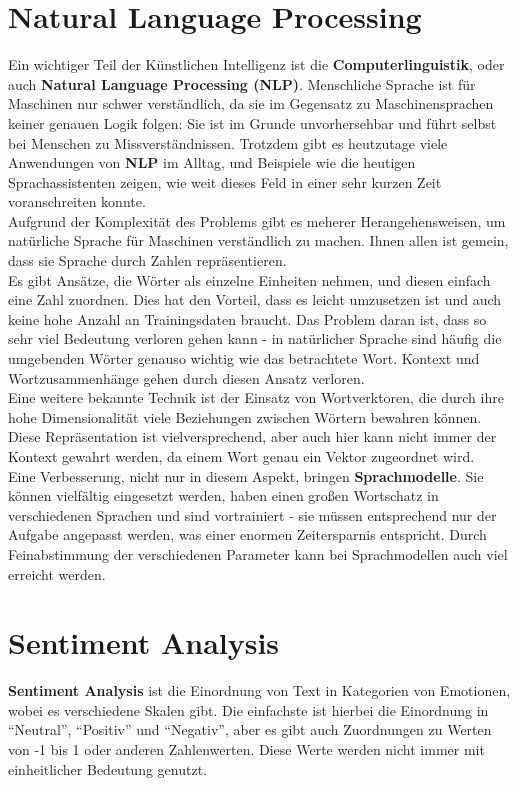 \section{Natural Language Processing}
Ein wichtiger Teil der K\"unstlichen Intelligenz ist die \textbf{Computerlinguistik}, oder auch \textbf{Natural Language Processing (NLP)}. Menschliche Sprache ist f\"ur Maschinen nur schwer verst\"andlich, da sie im Gegensatz zu Maschinensprachen keiner genauen Logik folgen: Sie ist im Grunde unvorhersehbar und f\"uhrt selbst bei Menschen zu Missverst\"andnissen. Trotzdem gibt es heutzutage viele Anwendungen von \textbf{NLP} im Alltag, und Beispiele wie die heutigen Sprachassistenten zeigen, wie weit dieses Feld in einer sehr kurzen Zeit voranschreiten konnte.\\
Aufgrund der Komplexit\"at des Problems gibt es meherer Herangehensweisen, um nat\"urliche Sprache f\"ur Maschinen verst\"andlich zu machen. Ihnen allen ist gemein, dass sie Sprache durch Zahlen repr\"asentieren. \\
Es gibt Ans\"atze, die W\"orter als einzelne Einheiten nehmen, und diesen einfach eine Zahl zuordnen. Dies hat den Vorteil, dass es leicht umzusetzen ist und auch keine hohe Anzahl an Trainingsdaten braucht. Das Problem daran ist, dass so sehr viel Bedeutung verloren gehen kann - in nat\"urlicher Sprache sind h\"aufig die umgebenden W\"orter genauso wichtig wie das betrachtete Wort. Kontext und Wortzusammenh\"ange gehen durch diesen Ansatz verloren.\\
Eine weitere bekannte Technik ist der Einsatz von Wortverktoren, die durch ihre hohe Dimensionalit\"at viele Beziehungen zwischen W\"ortern bewahren k\"onnen. Diese Repr\"asentation ist vielversprechend, aber auch hier kann nicht immer der Kontext gewahrt werden, da einem Wort genau ein Vektor zugeordnet wird.\\
Eine Verbesserung, nicht nur in diesem Aspekt, bringen \textbf{Sprachmodelle}. Sie k\"onnen vielf\"altig eingesetzt werden, haben einen gro{\ss}en Wortschatz in verschiedenen Sprachen und sind vortrainiert - sie m\"ussen entsprechend nur der Aufgabe angepasst werden, was einer enormen Zeitersparnis entspricht. Durch Feinabstimmung der verschiedenen Parameter kann bei Sprachmodellen auch viel erreicht werden.

\section{Sentiment Analysis}
\textbf{Sentiment Analysis} ist die Einordnung von Text in Kategorien von Emotionen, wobei es verschiedene Skalen gibt. Die einfachste ist hierbei die Einordnung in "`Neutral"', "`Positiv"' und "`Negativ"', aber es gibt auch Zuordnungen zu Werten von -1 bis 1 oder anderen Zahlenwerten. Diese Werte werden nicht immer mit einheitlicher Bedeutung genutzt. 


